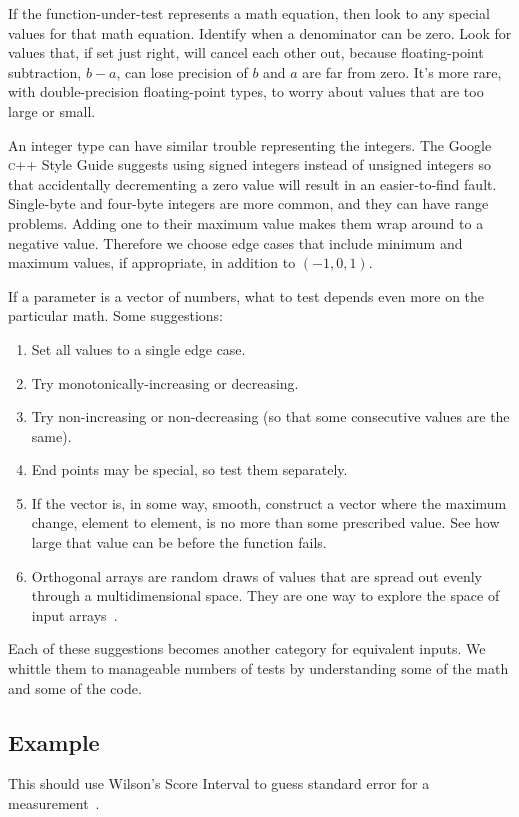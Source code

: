 \documentclass[fleqn,10pt]{olplainarticle}
\newcommand{\cpp}{\textsc{c}++\xspace}
\begin{document}
If the function-under-test represents a math equation, then
look to any special values for that math equation. Identify
when a denominator can be zero. Look for values that,
if set just right, will cancel each other out, because
floating-point subtraction, $b-a$, can lose precision of
$b$ and $a$ are far from zero. It's more rare, with double-precision
floating-point types, to worry about values that are too
large or small.

An integer type can have similar trouble representing
the integers. The Google \cpp Style Guide suggests using
signed integers instead of unsigned integers so that
accidentally decrementing a zero value will result in an
easier-to-find fault. Single-byte and four-byte integers
are more common, and they can have range problems. Adding
one to their maximum value makes them wrap around to a
negative value. Therefore we choose edge cases that include
minimum and maximum values, if appropriate, in addition
to $(-1, 0, 1)$.

If a parameter is a vector of numbers, what to test depends
even more on the particular math. Some suggestions:
\begin{enumerate}
    \item Set all values to a single edge case.
    \item Try monotonically-increasing or decreasing.
    \item Try non-increasing or non-decreasing (so that some
    consecutive values are the same).
    \item End points may be special, so test them separately.
    \item If the vector is, in some way, smooth, construct
    a vector where the maximum change, element to element, is no
    more than some prescribed value. See how large that value can
    be before the function fails.
    \item Orthogonal arrays are random draws of values that
    are spread out evenly through a multidimensional space.
    They are one way to explore the space of input arrays~\citep{Owen1992}.
\end{enumerate}
Each of these suggestions becomes another category for
equivalent inputs. We whittle them to manageable numbers of
tests by understanding some of the math and some of the code.


\subsection{Example}\label{sec:parameter-wilson}
This should use Wilson's Score Interval to guess standard error for a measurement~\citep{agresti1998approximate}.
\end{document}
